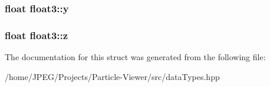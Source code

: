 \subsubsection[{y}]{\setlength{\rightskip}{0pt plus 5cm}float float3\+::y}\label{structfloat3_aa6147d421a81889971f8c66aa92abf0d}
\hypertarget{structfloat3_a772dffd42d89f350c5a1b766c4703245}{}
\subsubsection[{z}]{\setlength{\rightskip}{0pt plus 5cm}float float3\+::z}\label{structfloat3_a772dffd42d89f350c5a1b766c4703245}


The documentation for this struct was generated from the following file\+:\begin{DoxyCompactItemize}
\item 
/home/\+J\+P\+E\+G/\+Projects/\+Particle-\/\+Viewer/src/data\+Types.\+hpp\end{DoxyCompactItemize}

